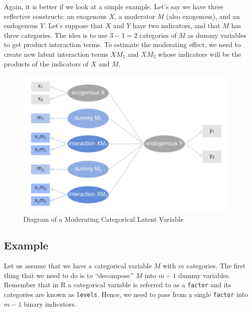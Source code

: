 \documentclass[12pt]{book}\usepackage{graphicx, color}
\newenvironment{knitrout}{}{} %
\newcommand{\code}[1]{\texttt{#1}}
\begin{document}
Again, it is better if we look at a simple example. Let's say we have three reflective constructs: an exogenous $X$, a moderator $M$ (also exogenous), and an endogenous $Y$. Let's suppose that $X$ and $Y$ have two indicators, and that $M$ has three categories. The idea is to use $3 - 1 = 2$ categories of $M$ as dummy variables to get product interaction terms. To estimate the moderating effect, we need to create new latent interaction terms $XM_1$ and $XM_2$ whose indicators will be the products of the indicators of $X$ and $M$. 




\begin{knitrout}
\color{fgcolor}\begin{figure}[h]


{\centering \includegraphics[width=.8\linewidth,height=.5\linewidth]{figure/cat_var_app_diag} 

}

\caption[Diagram of a Moderating Categorical Latent Variable]{Diagram of a Moderating Categorical Latent Variable\label{fig:cat_var_app_diag}}
\end{figure}


\end{knitrout}


\subsection{Example}
Let us assume that we have a categorical variable $M$ with $m$ categories. The first thing that we need to do is to ``decompose'' $M$ into $m - 1$ dummy variables. Remember that in R a categorical variable is referred to as a \code{factor} and its categories are known as \code{levels}. Hence, we need to pass from a single \code{factor} into $m-1$ binary indicators.
\end{document}
